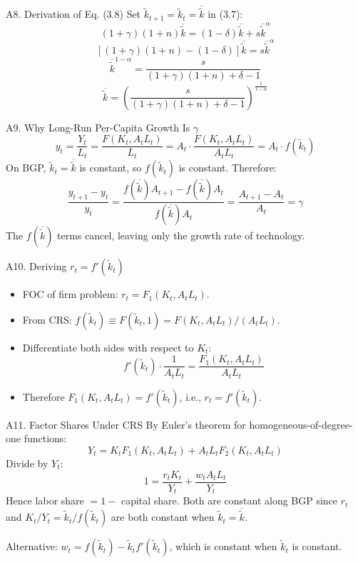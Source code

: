 \documentclass[aspectratio=169,10pt]{beamer}
\newcommand{\backbutton}[1]{\hfill\hyperlink{#1}{\beamerbutton{Back}}}
\begin{document}
\begin{frame}{A8. Derivation of Eq. (3.8)}
\hypertarget{a8}{}
Set $\tilde{k}_{t+1}=\tilde{k}_t=\overline{\tilde{k}}$ in (3.7):
\[
(1+\gamma)(1+n)\overline{\tilde{k}}=(1-\delta)\overline{\tilde{k}}+s\overline{\tilde{k}}^{\alpha}
\]
\[
[(1+\gamma)(1+n)-(1-\delta)]\overline{\tilde{k}}=s\overline{\tilde{k}}^{\alpha}
\]
\[
\overline{\tilde{k}}^{1-\alpha}=\frac{s}{(1+\gamma)(1+n)+\delta-1}
\]
\[
\overline{\tilde{k}}=\left(\frac{s}{(1+\gamma)(1+n)+\delta-1}\right)^{\frac{1}{1-\alpha}}
\]
\backbutton{m-a8}
\end{frame}

\begin{frame}{A9. Why Long-Run Per-Capita Growth Is $\gamma$}
\hypertarget{a9}{}
\[
y_t=\frac{Y_t}{L_t}=\frac{F(K_t,A_tL_t)}{L_t} = A_t\cdot\frac{F(K_t,A_tL_t)}{A_tL_t} = A_t\cdot f(\tilde{k}_t)
\]
On BGP, $\tilde{k}_t=\overline{\tilde{k}}$ is constant, so $f(\tilde{k}_t)$ is constant. Therefore:
\[
\frac{y_{t+1}-y_t}{y_t}=\frac{f(\overline{\tilde{k}})A_{t+1}-f(\overline{\tilde{k}})A_t}{f(\overline{\tilde{k}})A_t}=\frac{A_{t+1}-A_t}{A_t}=\gamma
\]
The $f(\overline{\tilde{k}})$ terms cancel, leaving only the growth rate of technology.
\backbutton{m-a9}
\end{frame}

\begin{frame}{A10. Deriving $r_t=f'(\tilde{k}_t)$}
\hypertarget{a10}{}
\begin{itemize}
  \item FOC of firm problem: $r_t=F_1(K_t,A_tL_t)$.
  \item From CRS: $f(\tilde{k}_t) \equiv F(\tilde{k}_t,1) = F(K_t,A_tL_t)/(A_tL_t)$.
  \item Differentiate both sides with respect to $K_t$:
\[
f'(\tilde{k}_t)\cdot\frac{1}{A_tL_t} = \frac{F_1(K_t,A_tL_t)}{A_tL_t}
\]
  \item Therefore $F_1(K_t,A_tL_t)=f'(\tilde{k}_t)$, i.e., $r_t = f'(\tilde{k}_t)$.
\end{itemize}
\backbutton{m-a10}
\end{frame}

\begin{frame}{A11. Factor Shares Under CRS}
\hypertarget{a11}{}
By Euler's theorem for homogeneous-of-degree-one functions:
\[
Y_t=K_tF_1(K_t,A_tL_t)+A_tL_tF_2(K_t,A_tL_t)
\]
Divide by $Y_t$:
\[
1=\frac{r_tK_t}{Y_t}+\frac{w_tA_tL_t}{Y_t}
\]
Hence labor share $= 1 -$ capital share. Both are constant along BGP since $r_t$ and $K_t/Y_t = \tilde{k}_t/f(\tilde{k}_t)$ are both constant when $\tilde{k}_t = \overline{\tilde{k}}$.

\medskip
Alternative: $w_t = f(\tilde{k}_t) - \tilde{k}_t f'(\tilde{k}_t)$, which is constant when $\tilde{k}_t$ is constant.
\backbutton{m-a11}
\end{frame}
\end{document}

